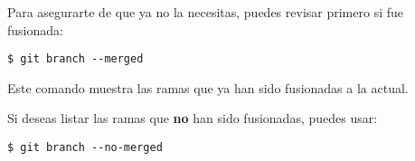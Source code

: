         Para asegurarte de que ya no la necesitas, puedes revisar primero si fue fusionada:
        \begin{lstlisting}
$ git branch --merged
        \end{lstlisting}
        Este comando muestra las ramas que ya han sido fusionadas a la actual.

        Si deseas listar las ramas que \textbf{no} han sido fusionadas, puedes usar:
        \begin{lstlisting}
$ git branch --no-merged
        \end{lstlisting}